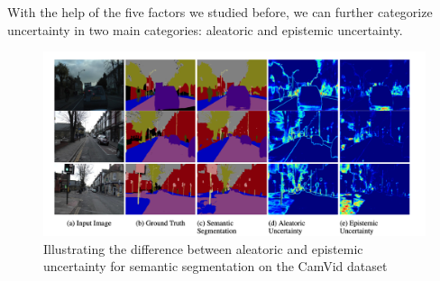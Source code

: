 With the help of the five factors we studied before, we can further categorize uncertainty in two main categories: aleatoric and epistemic uncertainty. \cite{Separation_uncer}

\begin{figure}[htb]
    \includegraphics[scale = 0.4]{img/uncert_visua.png}
    \caption[Illustrating the difference between aleatoric and epistemic uncertainty]{Illustrating the difference between aleatoric and epistemic uncertainty for semantic segmentation on the CamVid dataset \cite{DBLP:journals/corr/abs-1811-01412}}
    \label{fig:un_visua}
\end{figure}




